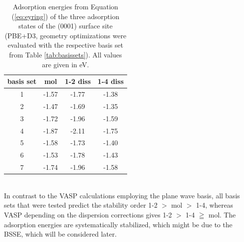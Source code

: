\documentclass[11pt,DIV=13,BCOR=5mm,a4paper,headinclude]{scrbook}
\begin{document}
\begin{table}[!h]
  \centering
   \caption{Adsorption energies from Equation (\ref{eq:eyring}) of the three adsorption states of the (0001) surface site (PBE+D3, geometry optimizations were evaluated with the respective basis set from Table \ref{tab:basissets}).
All values are given in eV.}
  \begin{tabular}{c|ccc}
  \toprule
  basis set & mol & 1-2 diss & 1-4 diss \\\midrule
  1 &-1.57 &-1.77 &-1.38 \\
  2 &-1.47 &-1.69 &-1.35 \\
  3 &-1.72 &-1.96 &-1.59 \\
  4 &-1.87 &-2.11 &-1.75 \\
  5 &-1.58 &-1.73 &-1.40 \\
  6 &-1.53 &-1.78 &-1.43 \\
  7 &-1.74 &-1.96 &-1.58 \\\bottomrule  
  \end{tabular}
  \label{tab:basisset-results-PBE+D3}
\end{table}
\\

In contrast to the VASP calculations employing the plane wave basis, all basis sets that were tested predict the stability order 1-2 $>$ mol $>$ 1-4, whereas VASP depending on the dispersion corrections gives 1-2 $>$ 1-4 $\geqq$ mol.
The adsorption energies are systematically stabilized, which might be due to the BSSE, which will be considered later.
\end{document}
